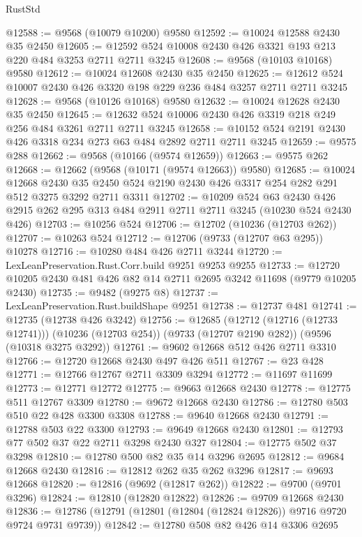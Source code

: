 \begin{lexlean}{RustStd}
\begin{coremodule}
@12588 := @9568 (@10079 @10200) @9580
@12592 := @10024 @12588 @2430 @35 @2450
@12605 := @12592 @524 @10008 @2430 @426 @3321 @193 @213 @220 @484 @3253 @2711 @2711 @3245
@12608 := @9568 (@10103 @10168) @9580
@12612 := @10024 @12608 @2430 @35 @2450
@12625 := @12612 @524 @10007 @2430 @426 @3320 @198 @229 @236 @484 @3257 @2711 @2711 @3245
@12628 := @9568 (@10126 @10168) @9580
@12632 := @10024 @12628 @2430 @35 @2450
@12645 := @12632 @524 @10006 @2430 @426 @3319 @218 @249 @256 @484 @3261 @2711 @2711 @3245
@12658 := @10152 @524 @2191 @2430 @426 @3318 @234 @273 @63 @484 @2892 @2711 @2711 @3245
@12659 := @9575 @288
@12662 := @9568 (@10166 (@9574 @12659))
@12663 := @9575 @262
@12668 := @12662 (@9568 (@10171 (@9574 @12663)) @9580)
@12685 := @10024
    @12668
    @2430
    @35
    @2450
    @524
    @2190
    @2430
    @426
    @3317
    @254
    @282
    @291
    @512
    @3275
    @3292
    @2711
    @3311
@12702 := @10209
    @524
    @63
    @2430
    @426
    @2915
    @262
    @295
    @313
    @484
    @2911
    @2711
    @2711
    @3245
    (@10230 @524 @2430 @426)
@12703 := @10256 @524
@12706 := @12702 (@10236 (@12703 @262))
@12707 := @10263 @524
@12712 := @12706 (@9733 (@12707 @63 @295)) @10278
@12716 := @10280 @484 @426 @2711 @3244
@12720 := LexLeanPreservation.Rust.Corr.build @9251 @9253 @9255
@12733 := @12720 @10205 @2430 @481 @426 @82 @14 @2711 @2695 @3242 @11698 (@9779 @10205 @2430)
@12735 := @9482 (@9275 @8)
@12737 := LexLeanPreservation.Rust.buildShape @9251
@12738 := @12737 @481
@12741 := @12735 (@12738 @426 @3242)
@12756 := @12685
    (@12712 (@12716 (@12733 @12741)))
    (@10236 (@12703 @254))
    (@9733 (@12707 @2190 @282))
    (@9596 (@10318 @3275 @3292))
@12761 := @9602 @12668 @512 @426 @2711 @3310
@12766 := @12720 @12668 @2430 @497 @426 @511
@12767 := @23 @428
@12771 := @12766 @12767 @2711 @3309 @3294
@12772 := @11697 @11699
@12773 := @12771 @12772
@12775 := @9663 @12668 @2430
@12778 := @12775 @511 @12767 @3309
@12780 := @9672 @12668 @2430
@12786 := @12780 @503 @510 @22 @428 @3300 @3308
@12788 := @9640 @12668 @2430
@12791 := @12788 @503 @22 @3300
@12793 := @9649 @12668 @2430
@12801 := @12793 @77 @502 @37 @22 @2711 @3298 @2430 @327
@12804 := @12775 @502 @37 @3298
@12810 := @12780 @500 @82 @35 @14 @3296 @2695
@12812 := @9684 @12668 @2430
@12816 := @12812 @262 @35 @262 @3296
@12817 := @9693 @12668
@12820 := @12816 (@9692 (@12817 @262))
@12822 := @9700 (@9701 @3296)
@12824 := @12810 (@12820 @12822)
@12826 := @9709 @12668 @2430
@12836 := @12786 (@12791 (@12801 (@12804 (@12824 @12826)) @9716 @9720 @9724 @9731 @9739))
@12842 := @12780 @508 @82 @426 @14 @3306 @2695

\end{coremodule}
\end{lexlean}
